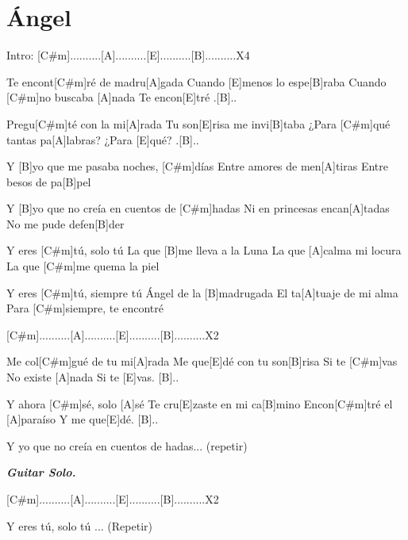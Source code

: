 \section{Ángel}

\noindent
\chordCshm
\chordB
\chordA
\chordE

\vspace{1cm}

\begin{guitar}
\begin{multicols}{2}

	Intro: [C#m]..........[A]..........[E]..........[B]..........X4


	Te encont[C#m]ré de madru[A]gada
	Cuando [E]menos lo espe[B]raba
	Cuando [C#m]no buscaba [A]nada
	Te encon[E]tré .[B]..



	Pregu[C#m]té con la mi[A]rada
	Tu son[E]risa me invi[B]taba
	¿Para [C#m]qué tantas pa[A]labras?
	¿Para [E]qué? .[B]..



	Y [B]yo que me pasaba noches, [C#m]días
	Entre amores de men[A]tiras
	Entre besos de pa[B]pel



	Y [B]yo que no creía en cuentos de [C#m]hadas
	Ni en princesas encan[A]tadas
	No me pude defen[B]der



	Y eres [C#m]tú, solo tú
	La que [B]me lleva a la Luna
	La que [A]calma mi locura
	La que [C#m]me quema la piel



	Y eres [C#m]tú, siempre tú
	Ángel de la [B]madrugada
	El ta[A]tuaje de mi alma
	Para [C#m]siempre, te encontré



	[C#m]..........[A]..........[E]..........[B]..........X2



	Me col[C#m]gué de tu mi[A]rada
	Me que[E]dé con tu son[B]risa
	Si te [C#m]vas
	No existe [A]nada
	Si te [E]vas. [B]..



	Y ahora [C#m]sé, solo [A]sé
	Te cru[E]zaste en mi ca[B]mino
	Encon[C#m]tré el [A]paraíso
	Y me que[E]dé. [B]..



	Y yo que no creía en cuentos de hadas... (repetir)

	\textit{\textbf{Guitar Solo.}}


	[C#m]..........[A]..........[E]..........[B]..........X2

	Y eres tú, solo tú ... (Repetir)

	\vspace{0.3cm}
\end{multicols}
\end{guitar}



